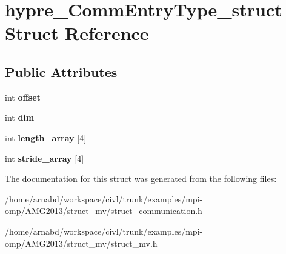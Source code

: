 \hypertarget{structhypre__CommEntryType__struct}{}\section{hypre\+\_\+\+Comm\+Entry\+Type\+\_\+struct Struct Reference}
\label{structhypre__CommEntryType__struct}
\subsection*{Public Attributes}
\begin{DoxyCompactItemize}
\item 
\hypertarget{structhypre__CommEntryType__struct_a8adae81a123e6e3af7a1817090ca852e}{}int {\bfseries offset}\label{structhypre__CommEntryType__struct_a8adae81a123e6e3af7a1817090ca852e}

\item 
\hypertarget{structhypre__CommEntryType__struct_ae146a9a19cba2f3efe3eab6ebb0c5002}{}int {\bfseries dim}\label{structhypre__CommEntryType__struct_ae146a9a19cba2f3efe3eab6ebb0c5002}

\item 
\hypertarget{structhypre__CommEntryType__struct_a79b7323b9b437a9cd35ac19b8c689769}{}int {\bfseries length\+\_\+array} \mbox{[}4\mbox{]}\label{structhypre__CommEntryType__struct_a79b7323b9b437a9cd35ac19b8c689769}

\item 
\hypertarget{structhypre__CommEntryType__struct_a1aa6334d04351fdb86fa43dd6e5b2ec6}{}int {\bfseries stride\+\_\+array} \mbox{[}4\mbox{]}\label{structhypre__CommEntryType__struct_a1aa6334d04351fdb86fa43dd6e5b2ec6}

\end{DoxyCompactItemize}


The documentation for this struct was generated from the following files\+:\begin{DoxyCompactItemize}
\item 
/home/arnabd/workspace/civl/trunk/examples/mpi-\/omp/\+A\+M\+G2013/struct\+\_\+mv/struct\+\_\+communication.\+h\item 
/home/arnabd/workspace/civl/trunk/examples/mpi-\/omp/\+A\+M\+G2013/struct\+\_\+mv/struct\+\_\+mv.\+h\end{DoxyCompactItemize}
